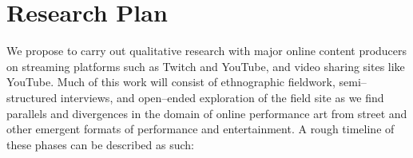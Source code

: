\documentclass[10pt]{article}
\newcommand{\ali}[1]{{\color{Red}[al2: #1]}}
\newcommand{\topic}[1]{{\color{Blue}#1}}
\begin{document}

\section*{Research Plan}
\topic{We propose to carry out qualitative research with major online content producers
on streaming platforms such as Twitch and YouTube, and video sharing sites like YouTube.}
Much of this work will consist of ethnographic fieldwork, semi--structured interviews, and
open--ended exploration of the field site as we find parallels and divergences in the domain
of online performance art from street and other emergent formats of performance and entertainment.
A rough timeline of these phases can be described as such:
\end{document}
